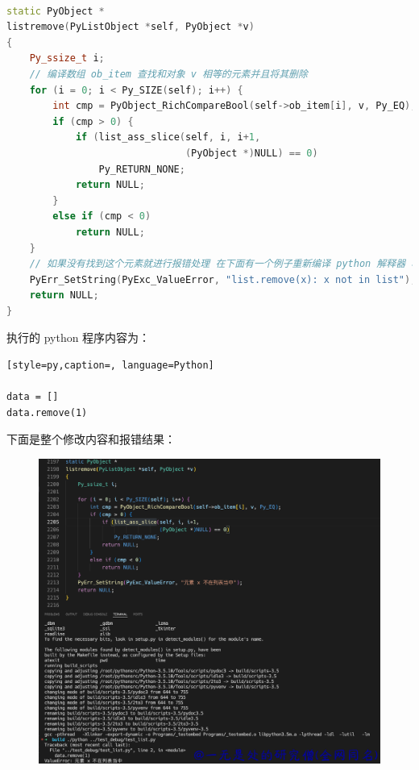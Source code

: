 \begin{lstlisting}[style=cpp,caption=cpython/objects/list.c, language=C++]

static PyObject *
listremove(PyListObject *self, PyObject *v)
{
    Py_ssize_t i;
  	// 编译数组 ob_item 查找和对象 v 相等的元素并且将其删除
    for (i = 0; i < Py_SIZE(self); i++) {
        int cmp = PyObject_RichCompareBool(self->ob_item[i], v, Py_EQ);
        if (cmp > 0) {
            if (list_ass_slice(self, i, i+1,
                               (PyObject *)NULL) == 0)
                Py_RETURN_NONE;
            return NULL;
        }
        else if (cmp < 0)
            return NULL;
    }
  	// 如果没有找到这个元素就进行报错处理 在下面有一个例子重新编译 python 解释器 将这个错误内容修改的例子
    PyErr_SetString(PyExc_ValueError, "list.remove(x): x not in list");
    return NULL;
}
\end{lstlisting}
执行的 python 程序内容为：
\begin{lstlisting}[style=py,caption=, language=Python]

data = []
data.remove(1)
\end{lstlisting}
下面是整个修改内容和报错结果：

    \begin{figure}[H]
        \centering
            \includegraphics[scale=.2]{images/06-list.png}
            \caption{ }
        \label{fig:my_label}
    \end{figure}
    
